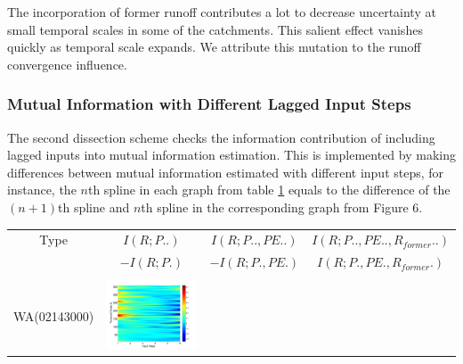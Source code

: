 \documentclass[draft,wrr]{AGUTeX}
\begin{document}
\begin{article}
The incorporation of former runoff contributes a lot to decrease uncertainty at small temporal scales in some of the catchments. This salient effect vanishes quickly as temporal scale expands. We attribute this  mutation to the runoff convergence influence.     
 
\subsubsection{Mutual Information with Different Lagged Input Steps}
The second dissection scheme checks the information contribution of including lagged inputs into mutual information estimation. This is implemented by making differences between mutual information estimated with different input steps, for instance, the $n$th spline in each graph from table \ref{former}  equals to the difference of the   $(n+1)$th spline and  $n$th spline in the corresponding graph from Figure 6.
\begin{table}[H]\small
\label{former}
\centering
\begin{tabular}{cccc}
\hline
Type&$I(R;P..)$&$I(R;P..,PE..) $&$I(R;P..,PE..,R_{former}..)$\\
 &$ -I(R;P.)$ &$ -I(R;P.,PE.)$&$I(R;P.,PE.,R_{former}.)$\\\hline
\\
WA(02143000)
&\begin{minipage}{.3\textwidth}\includegraphics[width=\linewidth]{resultgraph/02143000pdiff_former.png}\end{minipage}

\end{tabular}
\end{table}
\end{article}
\end{document}
